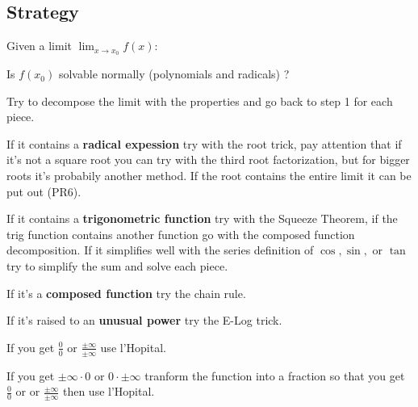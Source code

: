 \documentclass[8pt,a4paper]{extarticle}     %
\theoremstyle{definition}
\theoremstyle{definition}
\theoremstyle{definition}
\begin{document}
\begin{multicols}{4}
\subsection{Strategy}
Given a limit $\displaystyle\lim_{x \to x_0}f(x)$:
\begin{numberlist}
	\item Is $f(x_0)$ solvable normally (polynomials and radicals) ?
	\item Try to decompose the limit with the properties and go back to step 1 for each piece.
	\item If it contains a \textbf{radical expession} try with the root trick, pay attention that if it's not a square root you can try with the third root factorization, but for bigger roots it's probabily another method. If the root contains the entire limit it can be put out (PR6).
	\item If it contains a \textbf{trigonometric function} try with the Squeeze Theorem, if the trig function contains another function go with the composed function decomposition. If it simplifies well with the series definition of $\cos,\sin,$ or $\tan$ try to simplify the sum and solve each piece.
	\item If it's a \textbf{composed function} try the chain rule.
	\item If it's raised to an \textbf{unusual power} try the E-Log trick.
	\item If you get $\frac{0}{0}$ or $\frac{\pm\infty}{\pm\infty}$ use l'Hopital.
	\item If you get $\pm\infty\cdot 0$ or $0\cdot\pm\infty$ tranform the function into a fraction so that you get $\frac{0}{0}$ or or $\frac{\pm\infty}{\pm\infty}$ then use l'Hopital.

\end{numberlist}


\end{multicols}
\end{document}
